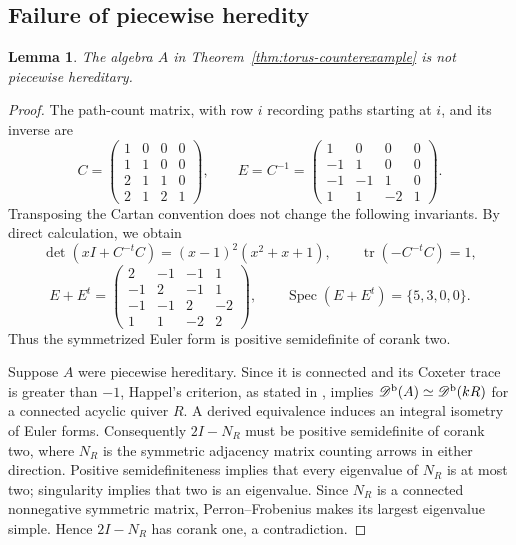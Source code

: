 \documentclass[12pt,a4paper,english,reqno]{amsart}
\theoremstyle{plain}
\newtheorem{lem}[thm]{Lemma}
\theoremstyle{definition}
\numberwithin{equation}{section}
\newcommand{\thmref}[1]{Theorem~\ref{#1}}
\def\Db{{\mathcal D}^{\text{\rm b}}}
\begin{document}
\subsection{Failure of piecewise heredity}
\begin{lem}\label{lem:torus-not-ph}
The algebra $A$ in \thmref{thm:torus-counterexample} is not piecewise hereditary.
\end{lem}
\begin{proof}
The path-count matrix, with row $i$ recording paths starting at $i$, and its inverse are
\[
 C=\begin{pmatrix}1&0&0&0\\1&1&0&0\\2&1&1&0\\2&1&2&1\end{pmatrix},
 \qquad E=C^{-1}=\begin{pmatrix}1&0&0&0\\-1&1&0&0\\-1&-1&1&0\\1&1&-2&1\end{pmatrix}.
\]
Transposing the Cartan convention does not change the following invariants. By direct calculation, we obtain
\[
 \det(xI+C^{-t}C)=(x-1)^2(x^2+x+1),\qquad
 \operatorname{tr}(-C^{-t}C)=1,
\]
\[
 E+E^t=\begin{pmatrix}2&-1&-1&1\\-1&2&-1&1\\-1&-1&2&-2\\1&1&-2&2\end{pmatrix},
 \qquad \operatorname{Spec}(E+E^t)=\{5,3,0,0\}.
\]
Thus the symmetrized Euler form is positive semidefinite of corank two.

Suppose $A$ were piecewise hereditary. Since it is connected and its Coxeter trace is greater than $-1$, Happel's criterion, as stated in \cite[Theorem 1.1(1)]{LRT}, implies $\Db(A)\simeq\Db(kR)$ for a connected acyclic quiver $R$. A derived equivalence induces an integral isometry of Euler forms. Consequently $2I-N_R$ must be positive semidefinite of corank two, where $N_R$ is the symmetric adjacency matrix counting arrows in either direction. Positive semidefiniteness implies that every eigenvalue of $N_R$ is at most two; singularity implies that two is an eigenvalue. Since $N_R$ is a connected nonnegative symmetric matrix, Perron--Frobenius makes its largest eigenvalue simple. Hence $2I-N_R$ has corank one, a contradiction.
\end{proof}
\end{document}
